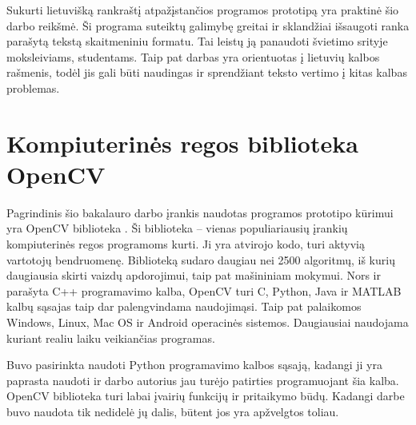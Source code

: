 \documentclass[a4paper,12pt]{article}
\begin{document}
Sukurti lietuvišką rankraštį atpažįstančios programos prototipą yra praktinė šio darbo reikšmė. Ši programa suteiktų galimybę greitai ir sklandžiai išsaugoti ranka parašytą tekstą skaitmeniniu formatu. Tai leistų ją panaudoti švietimo srityje moksleiviams, studentams. Taip pat darbas yra orientuotas į lietuvių kalbos rašmenis, todėl jis gali būti naudingas ir sprendžiant teksto vertimo į kitas kalbas problemas.

\clearpage

\section{Kompiuterinės regos biblioteka OpenCV}

Pagrindinis šio bakalauro darbo įrankis naudotas programos prototipo kūrimui yra OpenCV biblioteka \cite{CVWEB}. Ši biblioteka – vienas populiariausių įrankių kompiuterinės regos programoms kurti. Ji yra atvirojo kodo, turi aktyvią vartotojų bendruomenę. Biblioteką sudaro daugiau nei 2500 algoritmų, iš kurių daugiausia skirti vaizdų apdorojimui, taip pat mašininiam mokymui. Nors ir parašyta C++ programavimo kalba, OpenCV turi C, Python, Java ir MATLAB kalbų sąsajas taip dar palengvindama naudojimąsi. Taip pat palaikomos Windows, Linux, Mac OS ir Android operacinės sistemos. Daugiausiai naudojama kuriant realiu laiku veikiančias programas.

Buvo pasirinkta naudoti Python programavimo kalbos sąsają, kadangi ji yra paprasta naudoti ir darbo autorius jau turėjo patirties programuojant šia kalba. OpenCV biblioteka turi labai įvairių funkcijų ir pritaikymo būdų. Kadangi darbe buvo naudota tik nedidelė jų dalis, būtent jos yra apžvelgtos toliau.
\end{document}
